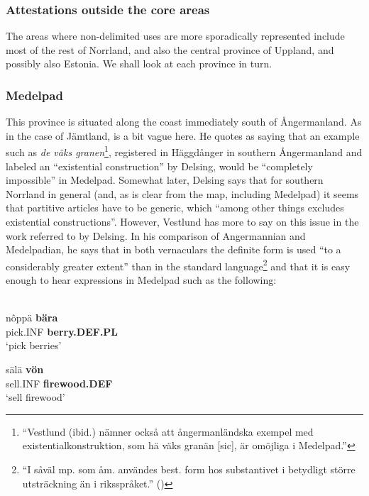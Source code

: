 \z

\subsubsection{Attestations outside the core areas}
 The areas where non-delimited uses are more sporadically represented include most of the rest of Norrland, and also the central province of Uppland, and possibly also Estonia. We shall look at each province in turn.

\subsubsection{Medelpad}
 This province is situated along the coast immediately south of Ångermanland. As in the case of Jämtland, \citet[19]{Delsing2003a} is a bit vague here. He quotes \citet[21]{Vestlund1923} as saying that an example such as \textit{de väks granen}\footnote{ “Vestlund (ibid.) nämner också att ångermanländska exempel med existentialkonstruktion, som hä väks granän [sic], är omöjliga i Medelpad.”}, registered in Häggdånger in southern Ångermanland and labeled an “existential construction” by Delsing, would be “completely impossible” in Medelpad. Somewhat later, Delsing says that for southern Norrland in general (and, as is clear from the map, including Medelpad) it seems that partitive articles have to be generic, which “among other things excludes existential constructions”. However, Vestlund has more to say on this issue in the work referred to by Delsing. In his comparison of Angermannian and Medelpadian, he says that in both vernaculars the definite form is used “to a considerably greater extent” than in the standard language\footnote{ “I såväl mp. som åm. användes best. form hos substantivet i betydligt större utsträckning än i riksspråket.” (\citet[20]{Vestlund1923})} and that it is easy enough to hear expressions in Medelpad such as the following:


\ea\label{}
\\
\gll nôppä  \textbf{bära}\\
pick.INF  \textbf{berry.DEF.PL}\\
\glt ‘pick berries’

\z

\ea
\gll sälä  \textbf{vön} \\
sell.INF  \textbf{firewood.DEF} \\
\glt ‘sell firewood’

